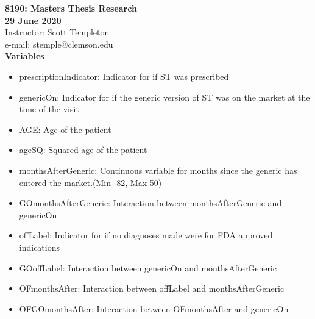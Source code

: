 
\let\counterwithout\relax
\let\counterwithin\relax
{}



\noindent \textbf{8190: Masters Thesis Research}\\
\noindent \textbf{29 June 2020}\\
\noindent Instructor: Scott Templeton \\
e-mail: stemple@clemson.edu\\

\noindent \textbf{Variables}\\
\begin{itemize}
    \item prescriptionIndicator: Indicator for if ST was prescribed
    \item genericOn: Indicator for if the generic version of ST was on the market at the time of the visit
    \item AGE: Age of the patient
    \item ageSQ: Squared age of the patient
    \item monthsAfterGeneric: Continuous variable for months since the generic has entered the market.(Min -82, Max 50)
    \item GOmonthsAfterGeneric: Interaction between monthsAfterGeneric and genericOn
    \item offLabel: Indicator for if no diagnoses made were for FDA approved indications
    \item GOoffLabel: Interaction between genericOn and monthsAfterGeneric
    \item OFmonthsAfter: Interaction between offLabel and monthsAfterGeneric
    \item OFGOmonthsAfter: Interaction between OFmonthsAfter and genericOn
\end{itemize}
\begin{landscape}

\newpage

\newpage

\newpage

\newpage

\newpage

\newpage

\end{landscape}




